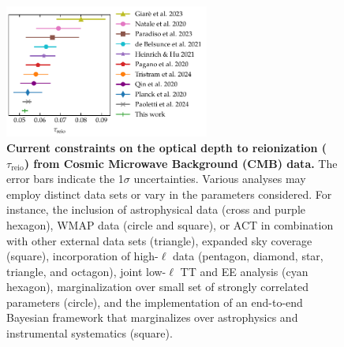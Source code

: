 \documentclass[12pt]{article}
\newcommand{\reio}{\mathrm{reio}}
\begin{document}
\begin{figure}
\centering
\includegraphics[width=0.6\textwidth]{figs/tau_fig.pdf}
\caption{\textbf{\boldmath Current constraints on the optical depth to
reionization ($\tau_\reio$) from Cosmic Microwave Background (CMB)
data.}
The error bars indicate the 1$\sigma$ uncertainties.
Various analyses may employ distinct data sets or vary in the parameters
considered.
For instance, the inclusion of astrophysical data \cite{Qin2020,
Paoletti2024} (cross and purple hexagon), WMAP data \cite{Natale2020,
Paradiso2023} (circle and square), or ACT in combination with other
external data sets \cite{Giare2023} (triangle), expanded sky coverage
\cite{Paradiso2023} (square), incorporation of high-$\ell$ data
\cite{Pagano2020, Planck2020a, HeinrichHu2021, Giare2023, Tristram2024}
(pentagon, diamond, star, triangle, and octagon), joint low-$\ell$ TT
and EE analysis \cite{deBelsunce2021} (cyan hexagon), marginalization
over small set of strongly correlated parameters \cite{Natale2020}
(circle), and the implementation of an end-to-end Bayesian framework
that marginalizes over astrophysics and instrumental systematics
\cite{Paradiso2023} (square).}
\label{fig:tau}
\end{figure}
\end{document}
